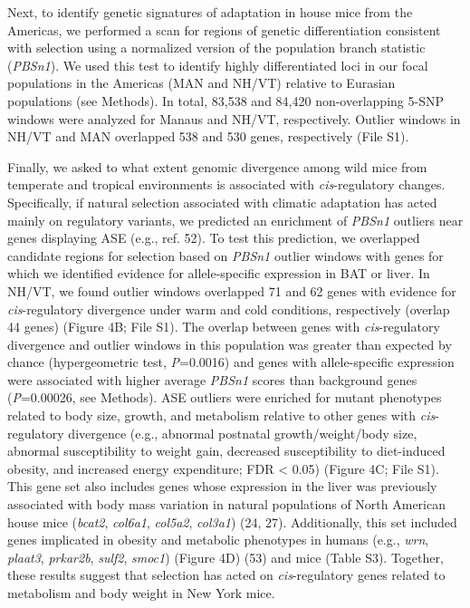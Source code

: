 \documentclass[9pt,twocolumn,twoside,lineno]{pnas-new}
\begin{document}
Next, to identify genetic signatures of adaptation in house mice from
the Americas, we performed a scan for regions of genetic differentiation
consistent with selection using a normalized version of the population
branch statistic (\emph{PBSn1}). We used this test to identify highly
differentiated loci in our focal populations in the Americas (MAN and
NH/VT) relative to Eurasian populations (see Methods). In total, 83,538
and 84,420 non-overlapping 5-SNP windows were analyzed for Manaus and
NH/VT, respectively. Outlier windows in NH/VT and MAN overlapped 538 and
530 genes, respectively (File S1).

Finally, we asked to what extent genomic divergence among wild mice from
temperate and tropical environments is associated with
\emph{cis}-regulatory changes. Specifically, if natural selection
associated with climatic adaptation has acted mainly on regulatory
variants, we predicted an enrichment of \emph{PBSn1} outliers near genes
displaying ASE (e.g., ref. 52). To test this prediction, we overlapped
candidate regions for selection based on \emph{PBSn1} outlier windows
with genes for which we identified evidence for allele-specific
expression in BAT or liver. In NH/VT, we found outlier windows
overlapped 71 and 62 genes with evidence for \emph{cis}-regulatory
divergence under warm and cold conditions, respectively (overlap 44
genes) (Figure 4B; File S1). The overlap between genes with
\emph{cis}-regulatory divergence and outlier windows in this population
was greater than expected by chance (hypergeometric test,
\emph{P}=0.0016) and genes with allele-specific expression were
associated with higher average \emph{PBSn1} scores than background genes
(\emph{P}=0.00026, see Methods). ASE outliers were enriched for mutant
phenotypes related to body size, growth, and metabolism relative to
other genes with \emph{cis}-regulatory divergence (e.g., abnormal
postnatal growth/weight/body size, abnormal susceptibility to weight
gain, decreased susceptibility to diet-induced obesity, and increased
energy expenditure; FDR \textless{} 0.05) (Figure 4C; File S1). This
gene set also includes genes whose expression in the liver was
previously associated with body mass variation in natural populations of
North American house mice (\emph{bcat2}, \emph{col6a1}, \emph{col5a2},
\emph{col3a1}) (24, 27). Additionally, this set included genes
implicated in obesity and metabolic phenotypes in humans (e.g.,
\emph{wrn}, \emph{plaat3}, \emph{prkar2b}, \emph{sulf2}, \emph{smoc1})
(Figure 4D) (53) and mice (Table S3). Together, these results suggest
that selection has acted on \emph{cis}-regulatory genes related to
metabolism and body weight in New York mice.
\end{document}
